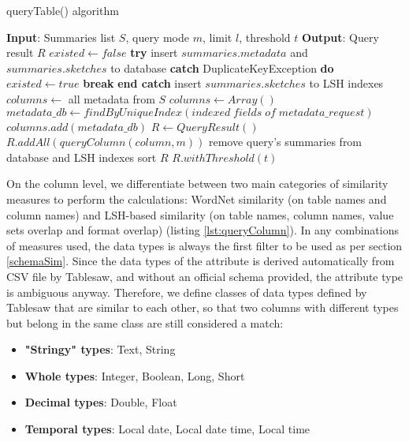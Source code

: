 \begin{algorithm}
    \caption{queryTable() algorithm}
    \label{alg:queryTable}
    \begin{algorithmic} [1]
\STATE \textbf{Input}: Summaries list $S$, query mode $m$, limit $l$, threshold $t$ 
\STATE \textbf{Output}: Query result $R$
\STATE $existed \gets false$
\STATE \textbf{try} insert $summaries.metadata$ and $summaries.sketches$ to database
\STATE \textbf{catch} DuplicateKeyException \textbf{do}
\STATE \; \; $existed \gets true$
\STATE \; \; \textbf{break}
\STATE \textbf{end catch}
\STATE insert $summaries.sketches$ to LSH indexes
\ENDFOR
{}
\STATE $columns \gets$ all metadata from $S$
\ELSE
\STATE $columns \gets Array()$
\STATE $metadata\_db \gets findByUniqueIndex(indexed \; fields \; of \; metadata\_request)$
\STATE $columns.add(metadata\_db)$
\ENDFOR
\ENDIF
\STATE $R \gets QueryResult()$
\STATE $R.addAll(queryColumn(column, m))$
\ENDFOR
{}
\STATE remove query's summaries from database and LSH indexes
\ENDIF
\STATE sort $R$
\RETURN $R.withThreshold(t)$
    \end{algorithmic}
\end{algorithm}

On the column level, we differentiate between two main categories of similarity measures to perform the calculations: WordNet similarity (on table names and column names) and LSH-based similarity (on table names, column names, value sets overlap and format overlap) (listing \ref{lst:queryColumn}). In any combinations of measures used, the data types is always the first filter to be used as per section \ref{schemaSim}. Since the data types of the attribute is derived automatically from CSV file by Tablesaw, and without an official schema provided, the attribute type is ambiguous anyway. Therefore, we define classes of data types defined by Tablesaw that are similar to each other, so that two columns with different types but belong in the same class are still considered a match:

\begin{itemize}
    \item \textbf{"Stringy" types}: Text, String
    \item \textbf{Whole types}: Integer, Boolean, Long, Short
    \item \textbf{Decimal types}: Double, Float
    \item \textbf{Temporal types}: Local date, Local date time, Local time
\end{itemize}

